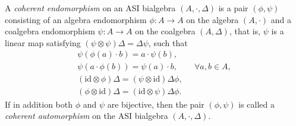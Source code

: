 \documentclass[10pt,a4paper]{amsart}
\numberwithin{equation}{section}
\newcommand{\id}{\mathrm{id}}
\begin{document}
\begin{Definition}
 A \textit{coherent endomorphism} on an ASI bialgebra $(A, \cdot, \Delta)$ is a pair $(\phi, \psi)$
 consisting of an algebra endomorphism $\phi\colon A \to A$ on the algebra $(A,\cdot)$ and a coalgebra endomorphism $\psi\colon A \to A$ on the coalgebra $(A,\Delta)$, that is, $\psi$ is a linear map satisfying $(\psi \otimes \psi)\Delta = \Delta \psi$,
 such that
 \begin{gather}
 \psi(\phi(a) \cdot b) = a \cdot \psi(b), \label{eq:coendo1} \\
 \psi(a \cdot \phi(b)) = \psi(a) \cdot b, \qquad \forall a, b \in A, \label{eq:coendo2} \\
 (\id \otimes \phi)\Delta = (\psi \otimes \id )\Delta \phi, \label{eq:coendo3}\\
 (\phi \otimes \id)\Delta = (\id \otimes \psi) \Delta \phi. \label{eq:coendo4}
 \end{gather}
 If in addition both $\phi$ and $\psi$ are bijective,
 then the pair $(\phi, \psi)$ is called a \textit{coherent automorphism} on the ASI bialgebra $(A, \cdot, \Delta)$.
\end{Definition}
\end{document}
